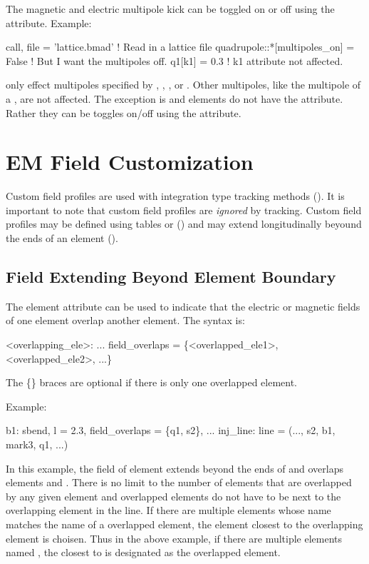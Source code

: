 The magnetic and electric multipole kick can be toggled on or off using the
 attribute. Example:
\begin{example}
  call, file = 'lattice.bmad'             ! Read in a lattice file
  quadrupole::*[multipoles_on] = False    ! But I want the multipoles off.
  q1[k1] = 0.3                            ! k1 attribute not affected.
\end{example}
 only effect multipoles specified by , , , or
. Other multipoles, like the  multipole of a , are not
affected. The exception is  and  elements do not have the
 attribute. Rather they can be toggles on/off using the 
attribute.

\section{EM Field Customization}
\label{s:em.fields}

Custom field profiles are used with integration type tracking methods ().
It is important to note that custom field profiles are {\em ignored} by 
tracking.  Custom field profiles may be defined using  tables or 
() and may extend longitudinally beyound the ends of an element
().

\subsection{Field Extending Beyond Element Boundary}
\label{s:overlap}

The  element attribute can be used to indicate that the electric or
magnetic fields of one element overlap another element. The syntax is:
\begin{example}
  <overlapping_ele>: ... field_overlaps = \{<overlapped_ele1>, <overlapped_ele2>, ...\}
\end{example}
The \{\} braces are optional if there is only one overlapped element.

Example:
\begin{example}
  b1: sbend, l = 2.3, field_overlaps = \{q1, s2\}, ...
  inj_line: line = (..., s2, b1, mark3, q1, ...)
\end{example}
In this example, the field of element  extends beyond the ends of  and
overlaps elements  and . There is no limit to the number of elements that
are overlapped by any given element and overlapped elements do not have to be next to the
overlapping element in the line. If there are multiple elements whose name matches the
name of a overlapped element, the element closest to the overlapping element is
choisen. Thus in the above example, if there are multiple elements named , the
closest  to  is designated as the overlapped element.

